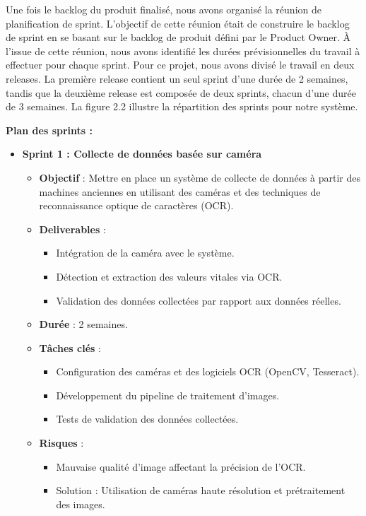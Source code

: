 Une fois le backlog du produit finalisé, nous avons organisé la réunion de planification de sprint. L'objectif de cette réunion était de construire le backlog de sprint en se basant sur le backlog de produit défini par le Product Owner. À l'issue de cette réunion, nous avons identifié les durées prévisionnelles du travail à effectuer pour chaque sprint. Pour ce projet, nous avons divisé le travail en deux releases. La première release contient un seul sprint d'une durée de 2 semaines, tandis que la deuxième release est composée de deux sprints, chacun d'une durée de 3 semaines. La figure 2.2 illustre la répartition des sprints pour notre système.

\medskip

\textbf{Plan des sprints :}

\begin{itemize}
    \item \textbf{Sprint 1 : Collecte de données basée sur caméra}
    \begin{itemize}
        \item \textbf{Objectif} : Mettre en place un système de collecte de données à partir des machines anciennes en utilisant des caméras et des techniques de reconnaissance optique de caractères (OCR).
        \item \textbf{Deliverables} :
            \begin{itemize}
                \item Intégration de la caméra avec le système.
                \item Détection et extraction des valeurs vitales via OCR.
                \item Validation des données collectées par rapport aux données réelles.
            \end{itemize}
        \item \textbf{Durée} : 2 semaines.
        \item \textbf{Tâches clés} :
            \begin{itemize}
                \item Configuration des caméras et des logiciels OCR (OpenCV, Tesseract).
                \item Développement du pipeline de traitement d'images.
                \item Tests de validation des données collectées.
            \end{itemize}
        \item \textbf{Risques} : 
            \begin{itemize}
                \item Mauvaise qualité d'image affectant la précision de l'OCR.
                \item Solution : Utilisation de caméras haute résolution et prétraitement des images.
            \end{itemize}
    \end{itemize}


\end{itemize}
